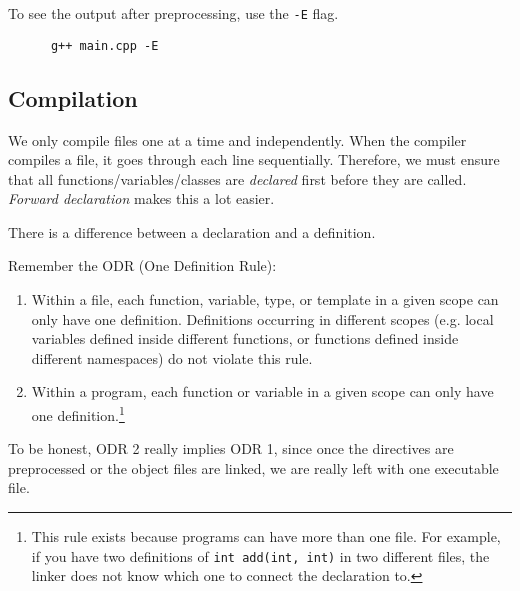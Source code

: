 \documentclass{article}
\begin{document}
    To see the output after preprocessing, use the \texttt{-E} flag. 
    \begin{lstlisting}
      g++ main.cpp -E
    \end{lstlisting}

  \subsection{Compilation} 

    We only compile files one at a time and independently. When the compiler compiles a file, it goes through each line sequentially. Therefore, we must ensure that all functions/variables/classes are \textit{declared} first before they are called. \textit{Forward declaration} makes this a lot easier. 

    There is a difference between a declaration and a definition. 

    \begin{definition}[ODR]
      Remember the ODR (One Definition Rule): 
      \begin{enumerate}
        \item Within a file, each function, variable, type, or template in a given scope can only have one definition. Definitions occurring in different scopes (e.g. local variables defined inside different functions, or functions defined inside different namespaces) do not violate this rule. 

        \item Within a program, each function or variable in a given scope can only have one definition.\footnote{This rule exists because programs can have more than one file. For example, if you have two definitions of \texttt{int add(int, int)} in two different files, the linker does not know which one to connect the declaration to.}
      \end{enumerate}
      To be honest, ODR 2 really implies ODR 1, since once the directives are preprocessed or the object files are linked, we are really left with one executable file. 
    \end{definition} 
\end{document}
